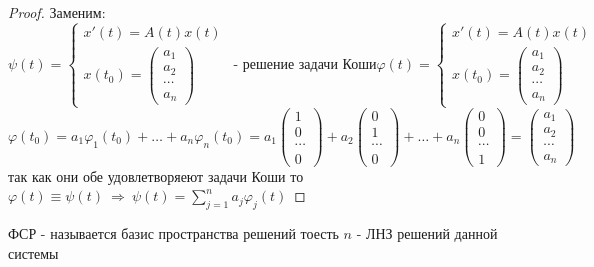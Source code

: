 \begin{proof}
  Заменим:
  $$
  \psi(t) =
  \left\{
  \begin{array}{c}
  x'(t) = A(t)x(t)\\
  x(t_0) =
  \left(
  \begin{array}{c}
    a_1 \\
    a_2 \\
    \cdots \\
    a_n
  \end{array}
  \right)
  \end{array}
  \right. ~~ \text{- решение задачи Коши}
  \varphi(t) =
  \left\{
  \begin{array}{c}
  x'(t) = A(t)x(t)\\
  x(t_0) =
  \left(
  \begin{array}{c}
    a_1 \\
    a_2 \\
    \cdots \\
    a_n
  \end{array}
  \right)
  \end{array}
  \right.
  $$
  $$
  \varphi(t_0) = a_1 \varphi_1(t_0) + \ldots + a_n \varphi_n(t_0) =
  a_1
  \left(
  \begin{array}{c}
    1 \\
    0 \\
    \cdots \\
    0
  \end{array}
  \right) +
  a_2
  \left(
  \begin{array}{c}
    0 \\
    1 \\
    \cdots \\
    0
  \end{array}
  \right) + \ldots +
  a_n
  \left(
  \begin{array}{c}
    0 \\
    0 \\
    \cdots \\
    1
  \end{array}
  \right) =
  \left(
  \begin{array}{c}
    a_1 \\
    a_2 \\
    \cdots \\
    a_n
  \end{array}
  \right)
  $$
  так как они обе удовлетворяеют задачи Коши то $\varphi(t) \equiv \psi(t) ~
  \Rightarrow ~ \psi(t) = \sum_{j=1}^n a_j \varphi_j(t)$
\end{proof}

\begin{define}[ФСР]
  ФСР - называется базис пространства решений тоесть $n$ - ЛНЗ решений данной
  системы
\end{define}

